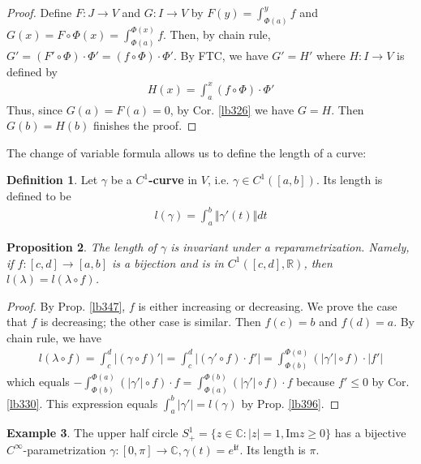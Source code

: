 \documentclass[12pt,b5paper,notitlepage]{article}
\theoremstyle{definition}
\newtheorem{df}{Definition}[section]
\newtheorem{eg}[df]{Example}
\theoremstyle{plain}
\newtheorem{pp}[df]{Proposition}
\newcommand{\im}{\mathbf{i}}
\newcommand{\Cbb}{\mathbb C}
\newcommand{\Rbb}{\mathbb R}
\newcommand{\Imag}{\mathrm{Im}}
\newcommand{\dps}{\displaystyle}
\numberwithin{equation}{section}
\begin{document}
\begin{proof}
Define $F:J\rightarrow V$ and $G:I\rightarrow V$ by $\dps F(y)=\int_{\Phi(a)}^y f$ and $\dps G(x)=F\circ\Phi(x)=\int_{\Phi(a)}^{\Phi(x)}f$. Then, by chain rule, $G'=(F'\circ\Phi)\cdot\Phi'=(f\circ\Phi)\cdot\Phi'$. By FTC, we have $G'=H'$ where $H:I\rightarrow V$ is defined by
\begin{align*}
H(x)=\int_a^x (f\circ\Phi)\cdot\Phi'
\end{align*}
Thus, since $G(a)=F(a)=0$, by Cor. \ref{lb326} we have $G=H$. Then $G(b)=H(b)$ finishes the proof.
\end{proof}



The change of variable formula allows us to define the length of a curve:


\begin{df}
Let $\gamma$ be a \textbf{$C^1$-curve} in $V$, i.e. $\gamma\in C^1([a,b])$. Its length  is defined to be
\begin{align*}
l(\gamma)=\int_a^b\Vert \gamma'(t)\Vert dt
\end{align*}
\end{df}

\begin{pp}
The length of $\gamma$ is invariant under a reparametrization. Namely, if $f:[c,d]\rightarrow[a,b]$ is a bijection and is in $C^1([c,d],\Rbb)$, then $l(\lambda)=l(\lambda\circ f)$.
\end{pp}

\begin{proof}
By Prop. \ref{lb347}, $f$ is either increasing or decreasing. We prove the case that $f$ is decreasing; the other case is similar. Then $f(c)=b$ and $f(d)=a$. By chain rule, we have
\begin{align*}
l(\lambda\circ f)=\int_c^d |(\gamma\circ f)'|=\int_c^d |(\gamma'\circ f)\cdot f'|=\int_{\Phi(b)}^{\Phi(a)} (|\gamma'|\circ f)\cdot |f'|
\end{align*}
which equals $-\int_{\Phi(b)}^{\Phi(a)} (|\gamma'|\circ f)\cdot f=\int_{\Phi(a)}^{\Phi(b)}(|\gamma'|\circ f)\cdot f$ because $f'\leq 0$ by Cor. \ref{lb330}. This expression equals $\int_a^b |\gamma'|=l(\gamma)$ by Prop. \ref{lb396}.
\end{proof}


\begin{eg}\label{lb398}
The upper half circle $S^1_+=\{z\in\Cbb:|z|=1,\Imag z\geq 0\}$ has a bijective $C^\infty$-parametrization $\gamma:[0,\pi]\rightarrow\Cbb,\gamma(t)=e^{\im t}$. Its length is $\pi$.
\end{eg}
\end{document}
